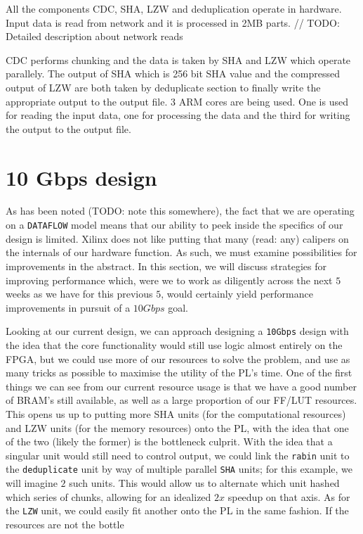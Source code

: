 \documentclass{article}
\begin{document}
All the components CDC, SHA, LZW and deduplication operate in hardware. 
Input data is read from network and it is processed in 2MB parts. 
// TODO: Detailed description about network reads

CDC performs chunking and the data is taken by SHA and LZW which operate parallely. The output of SHA which is 256 bit SHA value and the compressed output of LZW are both taken by deduplicate section to finally write the appropriate output to the output file. 
3 ARM cores are being used. One is used for reading the input data, one for processing the data and the third for writing the output to the output file.  


\section{10 Gbps design}

As has been noted (TODO: note this somewhere), the fact that we are operating on a \texttt{DATAFLOW} model means that our ability to peek inside the specifics of our design is limited. Xilinx does not like putting that many (read: any) calipers on the internals of our hardware function.\newline
As such, we must examine possibilities for improvements in the abstract. In this section, we will discuss strategies for improving performance which, were we to work as diligently across the next $5$ weeks as we have for this previous $5$, would certainly yield performance improvements in pursuit of a $10Gbps$ goal.
\newline\newline

Looking at our current design, we can approach designing a \texttt{10Gbps} design with the idea that the core functionality would still use logic almost entirely on the FPGA, but we could use more of our resources to solve the problem, and use as many tricks as possible to maximise the utility of the PL's time.
\newline\newline
One of the first things we can see from our current resource usage is that we have a good number of BRAM's still available, as well as a large proportion of our FF/LUT resources.
This opens us up to putting more SHA units (for the computational resources) and LZW units (for the memory resources) onto the PL, with the idea that one of the two (likely the former) is the bottleneck culprit.
With the idea that a singular  unit would still need to control output, we could link the \texttt{rabin} unit to the \texttt{deduplicate} unit by way of multiple parallel \texttt{SHA} units; for this example, we will imagine $2$ such units. This would allow us to alternate which unit hashed which series of chunks, allowing for an idealized $2x$ speedup on that axis.
As for the \texttt{LZW} unit, we could easily fit another onto the PL in the same fashion.
\newline\newline
If the resources are not the bottle
\end{document}
